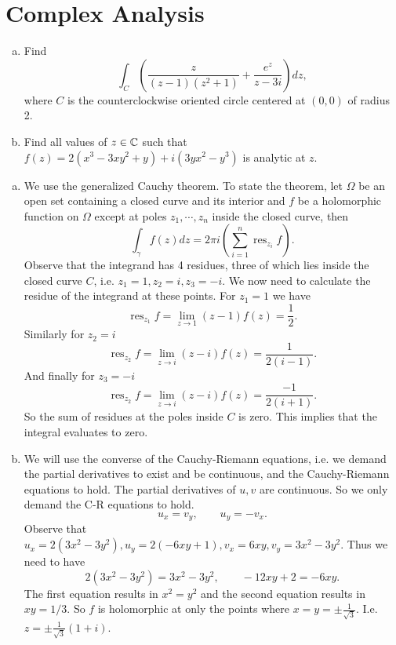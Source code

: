 \section{Complex Analysis}
\begin{problem}
	\begin{enumerate}[(a)]
		\item Find
		\[ \int_C \left(  \frac{z}{(z-1)(z^2+1)} + \frac{e^z}{z-3i}  \right) dz, \]
		where $ C $ is the counterclockwise oriented circle centered at $ (0,0) $ of radius 2.
		\item Find all values of $ z \in \mathbb{C} $ such that $ f(z) = 2(x^3-3xy^2+y) + i(3yx^2-y^3) $ is analytic at $ z $.
	\end{enumerate}
	
\end{problem}
\begin{solution}
	\begin{enumerate}[(a)]
		\item We use the generalized Cauchy theorem. To state the theorem, let $ \Omega $ be an open set containing a closed curve and its interior and $ f $ be a holomorphic function on $ \Omega $ except at poles $ z_1,\cdots,z_n $ inside the closed curve, then
		\[ \int_\gamma  f(z) dz = 2\pi i (\sum_{i=1}^n \operatorname{res}_{z_i}f). \]
		Observe that the integrand has 4 residues, three of which lies inside the closed curve $ C $, i.e. $ z_1=1, z_2 = i, z_3 = -i $. We now need to calculate the residue of the integrand at these points. For $ z_1 = 1 $ we have
		\[ \operatorname{res}_{z_1}f = \lim_{z\to1} (z-1)f(z) = \frac{1}{2}. \]
		Similarly for $ z_2 = i $
		\[ \operatorname{res}_{z_2}f = \lim_{z\to i} (z-i)f(z) = \frac{1}{2(i-1)}. \]
		And finally for $ z_3 = -i $
		\[ \operatorname{res}_{z_2}f = \lim_{z\to i} (z-i)f(z) = \frac{-1}{2(i+1)}. \]
		So the sum of residues at the poles inside $ C $ is zero. This implies that the integral evaluates to zero.
		
		\item We will use the converse of the Cauchy-Riemann equations, i.e. we demand the partial derivatives to exist and be continuous, and the Cauchy-Riemann equations to hold. The partial derivatives of $ u,v $ are continuous. So we only demand the C-R equations to hold.
		\[ u_x = v_y, \qquad u_y = -v_x. \]
		Observe that $ u_x = 2(3x^2-3y^2), u_y = 2(-6xy+1), v_x=6xy, v_y=3x^2-3y^2. $
		Thus we need to have
		\[ 2(3x^2-3y^2) = 3x^2-3y^2, \qquad -12xy+2 = -6xy. \]
		The first equation results in $ x^2 = y^2  $ and the second equation results in $ xy = 1/3 $. So $ f $ is holomorphic at only the points where $ x = y = \pm \frac{1}{\sqrt{3}} $. I.e. $ z = \pm\frac{1}{\sqrt{3}}(1+i) $.
	\end{enumerate}
	
\end{solution}


